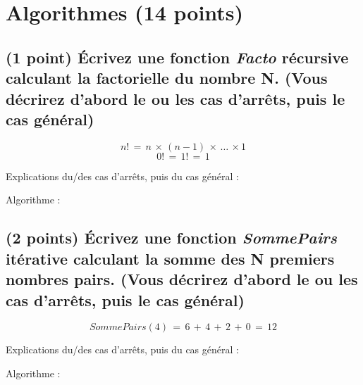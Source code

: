 \documentclass[11pt,a4paper]{article}
\begin{document}
\clearpage

\section{Algorithmes (14 points)}

\subsection{(1 point) \'Ecrivez une fonction \og \textit{Facto} \fg{} récursive calculant la factorielle du nombre N. (Vous décrirez d'abord le ou les cas d'arrêts, puis le cas général) }


\vspace*{-0.5cm}

\begin{center}

\begin{equation*}
n! \, = \, n \, \times \, (n - 1) \, \times \, \ldots \, \times 1
\end{equation*}
%
\vspace*{-0.5cm}
%
\begin{equation*}
0! \, = \, 1! \, = \, 1
\end{equation*}

Explications du/des cas d'arrêts, puis du cas général :

\bigskip

Algorithme :

\bigskip

\end{center}


\clearpage


\subsection{(2 points) \'Ecrivez une fonction \og \textit{SommePairs} \fg{} itérative calculant la somme des N premiers nombres pairs. (Vous décrirez d'abord le ou les cas d'arrêts, puis le cas général) }

\vspace*{-0.5cm}

\begin{center}

\begin{equation*}
SommePairs(4)  \, = \,  6 \, + \, 4 \, + \, 2 \, + \, 0  \, = \,  12
\end{equation*}

Explications du/des cas d'arrêts, puis du cas général :

\bigskip

Algorithme :

\bigskip

\end{center}
\end{document}
